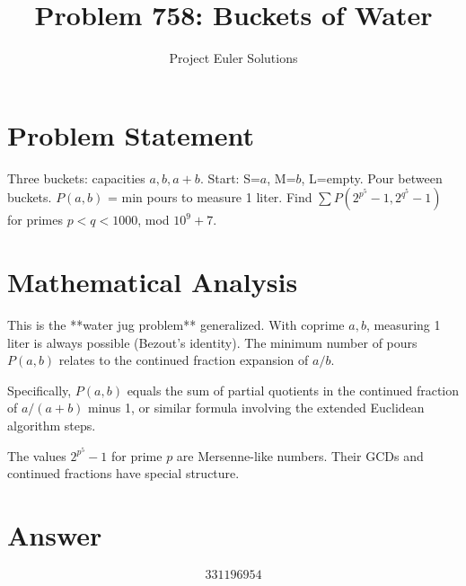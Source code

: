 \documentclass[11pt]{article}
\title{Problem 758: Buckets of Water}
\author{Project Euler Solutions}
\date{}
\begin{document}
\maketitle


\section{Problem Statement}
Three buckets: capacities $a, b, a+b$. Start: S=$a$, M=$b$, L=empty. Pour between buckets. $P(a,b)$ = min pours to measure 1 liter. Find $\sum P(2^{{p^5}}-1, 2^{{q^5}}-1)$ for primes $p<q<1000$, mod $10^9+7$.

\section{Mathematical Analysis}
This is the **water jug problem** generalized. With coprime $a, b$, measuring 1 liter is always possible (Bezout's identity). The minimum number of pours $P(a,b)$ relates to the continued fraction expansion of $a/b$.

Specifically, $P(a,b)$ equals the sum of partial quotients in the continued fraction of $a/(a+b)$ minus 1, or similar formula involving the extended Euclidean algorithm steps.

The values $2^{{p^5}}-1$ for prime $p$ are Mersenne-like numbers. Their GCDs and continued fractions have special structure.

\section{Answer}

\[
\boxed{331196954}
\]
\end{document}
